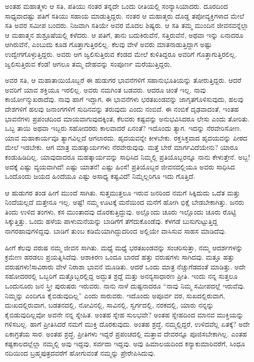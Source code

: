 ಅಂತಹ ಮಹಾತ್ಮಳು ಆ ಸತಿ, ಪತಿಯು ನಂತರ ತನ್ನದೇ ಒಂದು ರೀತಿಯಲ್ಲಿ ಸಂನ್ಯಾಸಿಯಾದರು. ದೂರದಿಂದ ಸಾಧ್ಯವಾದಷ್ಟು ಪತಿಗೆ ಸತಿಯು ಸಹಾಯ ಮಾಡುತ್ತಿದ್ದರು. ನಂತರ ಆ ಮಹಾತ್ಮರು ದೊಡ್ಡ ತಪೋವ್ಯಕ್ತಿಗಳಾದ ಮೇಲೆ ಸತಿ ಅವರ ಸಮೀಪ ಬಂದರು. ನಿಜವಾಗಿ ಸತಿಯೇ ಅವರ ಮೊದಲ ಶಿಷ್ಯರು. ಆ ಸತಿ ತಮ್ಮ ಮುಂದಿನ ಜೀವನವನ್ನೆಲ್ಲಾ ಆ ಮಹಾತ್ಮನ ಶುಶ್ರೂಷೆಯಲ್ಲಿ ಕಳೆದರು. ಆ ಪತಿಗೆ, ತಾನು ಬದುಕಿರುವೆನೆ, ಸತ್ತಿರುವೆನೆ, ಅಥವಾ ಇನ್ನು ಏನಾದರೂ ಆಗಿರುವೆನೆ, ಎಂಬುದು ಕೂಡ ಗೊತ್ತಾಗುತ್ತಿರಲಿಲ್ಲ. ಕೆಲವು ವೇಳೆ ಅವರು ಮಾತನಾಡುತ್ತಿದ್ದಾಗ ಅಷ್ಟು ಉದ್ವೇಗಗೊಳ್ಳುತ್ತಿದ್ದರು. ಅವರು ಆಗ ಜ್ವಲಿಸುತ್ತಿರುವ ಕೆಂಡದ ಮೇಲೆ ಕುಳಿತಿದ್ದರೂ ಅವರಿಗೆ ಗೊತ್ತಾಗುತ್ತಿರಲಿಲ್ಲ. ಜ್ವಲಿಸುತ್ತಿರುವ ಕೆಂಡ! ಆಗಲೂ ತಮ್ಮ ದೇಹವನ್ನು ಸಂಪೂರ್ಣ ಮರೆಯುತ್ತಿದ್ದರು.

ಅವರ ಸತಿ, ಆ ಮಹಾತಾಯಿಯೊಬ್ಬರೆ ಈ ಹುಡುಗರ ಭಾವನೆಗಳಿಗೆ ಸಹಾನುಭೂತಿಯನ್ನು ತೋರುತ್ತಿದ್ದರು. ಆದರೆ ಅವರಿಗೆ ಯಾವ ಶಕ್ತಿಯೂ ಇರಲಿಲ್ಲ. ಅವರು ನಮಗಿಂತ ಬಡವರು. ಆದರೂ ಚಿಂತೆ ಇಲ್ಲ. ನಾವು ಕಾರ್ಯೋನ್ಮುಖರಾದೆವು. ನಾವು ಹಾಗೆ ಇದ್ದಾಗ, ಈ ಭಾವನೆಗಳು ಭರತಖಂಡವನ್ನು ಜಾಗೃತಗೊಳಿಸುವುದು, ಹಲವು ದೇಶಗಳಿಗೆ ಹಲವು ಜನಾಂಗಗಳಿಗೆ ಸುದಿನವನ್ನು ತರುವುದು ಎಂದು ನಂಬಿದೆ. ಈ ನಂಬಿಕೆ ದೃಢವಾದಂತೆ, ಇಂತಹ ಭಾವನೆಗಳು ಪ್ರಪಂಚದಿಂದ ಮಾಯವಾಗುವುದಕ್ಕಿಂತ, ಕೆಲವರು ಕಷ್ಟವನ್ನು ಅನುಭವಿಸಿದರೂ ಲೇಸು ಎಂದು ತೋರಿತು. ಒಬ್ಬ ತಾಯಿ ಅಥವಾ ಇಬ್ಬರು ಸಹೋದರರು ಕಾಲವಾದರೆ ಏನಂತೆ? ಇದೊಂದು ತ್ಯಾಗ. ಇದನ್ನು ನೆರವೇರಿಸೋಣ. ಯಾವ ಮಹಾಕಾರ್ಯವೂ ತ್ಯಾಗವಿಲ್ಲದೆ ಆಗಲಾರದು. ಹೃದಯವನ್ನೇ ಕೀಳಬೇಕು. ರಕ್ತಸಿಕ್ತವಾದ ಹೃದಯವನ್ನು ಪೀಠದ ಮೇಲೆ ಇಡಬೇಕು. ಆಗ ಮಾತ್ರ ಮಹತ್ಕಾರ್ಯಗಳು ನೆರವೇರುವುವು. ಮತ್ತೆ ಬೇರೆ ಮಾರ್ಗವಿದೆಯೇನು? ಯಾರೂ ಕಂಡುಹಿಡಿದಿಲ್ಲ. ಯಾವುದಾದರೂ ಮಹತ್ಕಾರ್ಯವನ್ನು ಸಾಧಿಸಿದ ನಿಮ್ಮಲ್ಲಿ ಪ್ರತಿಯೊಬ್ಬರನ್ನೂ ನಾನು ಕೇಳುತ್ತೇನೆ. ಅಬ್ಬ! ಅದಕ್ಕೆ ಎಷ್ಟು ವ್ಯಯವಾಗಿದೆ! ಎಷ್ಟು ಯಾತನೆ! ಎಷ್ಟು ಹಿಂಸೆ! ಪ್ರತಿಯೊಬ್ಬರ ಜೀವನದಲ್ಲಿಯೂ ಅವರು ಸಾಧಿಸಿದ ಒಂದೊಂದು ಜಯದ ಹಿಂದೆಯೂ ಎಷ್ಟು ಅಸಾಧ್ಯ ಕಷ್ಟವಿದೆ! ನಿಮ್ಮೆಲ್ಲರಿಗೂ ಇದು ಗೊತ್ತಿದೆ.

ಆ ಹುಡುಗರ ತಂಡ ಹೀಗೆ ಮುಂದೆ ಸಾಗಿತು. ಸುತ್ತಮುತ್ತಲೂ ಇರುವ ಜನರಿಂದ ನಮಗೆ ಸಿಕ್ಕಿದುದು ಒದೆತ ಮತ್ತು ನಿಂದೆಯಲ್ಲದೆ ಮತ್ತೇನೂ ಇಲ್ಲ. ಅಷ್ಟೆ! ನಮ್ಮ ಊಟಕ್ಕೆ ಮನೆಯಿಂದ ಮನೆಗೆ ಹೋಗಿ ಭಿಕ್ಷೆ ಬೇಡಬೇಕಾಗಿತ್ತು. ಜನರು ತಿಂದು ಉಳಿದ ತಂಗಳು, ಕಸ ಮುಂತಾದವು ದೊರಕುತ್ತಿದ್ದುವು. ಅಲ್ಲೊಂದು ಚೂರು ಇಲ್ಲೊಂದು ಚೂರು ರೊಟ್ಟಿ ಸಿಕ್ಕುತ್ತಿತ್ತು. ಒಂದು ಹಳೆಯ ಪಾಳುಮನೆಯನ್ನು ಬಾಡಿಗೆಗೆ ತೆಗೆದುಕೊಂಡೆವು. ಕೆಳಗಡೆ ಬುಸುಗುಟ್ಟುತ್ತಿದ್ದ ನಾಗರಹಾವುಗಳಿದ್ದವು. ಬಾಡಿಗೆ ತುಂಬ ಕಡಿಮೆಯಾಗಿದ್ದುದರಿಂದ ಅಲ್ಲಿಯೇ ವಾಸಿಸುವ ಸಾಹಸ ಮಾಡಿದೆವು.

ಹೀಗೆ ಕೆಲವು ವರುಷ ನಮ್ಮ ಜೀವನ ಸಾಗಿತು. ಮಧ್ಯೆ ಮಧ್ಯೆ ಭರತಖಂಡವನ್ನು ಸಂಚರಿಸುತ್ತಾ, ನಮ್ಮ ಆದರ್ಶಗಳನ್ನು ಕ್ರಮೇಣ ಹರಡಲು ಪ್ರಯತ್ನಿಸಿದೆವು. ಆಶಾಕಿರಣ ಒಂದೂ ಬಾರದೆ ಹತ್ತು ವರುಷಗಳು ಸಾಗಿದವು. ಮತ್ತೂ ಹತ್ತು ವರುಷಗಳು!ಸಾವಿರಾರು ವೇಳೆ ನಿರಾಶಾ ಭಾವನೆ ಮೂಡಿತು. ಆದರೆ ಒಂದು ಮಾತ್ರ ನೆಚ್ಚುಗೆಡದಂತೆ ಮಾಡಿತ್ತು. ಅದೇ ಸಹೋದರರಲ್ಲಿ ಒಬ್ಬರಿಗೆ ಮತ್ತೊಬ್ಬರಲ್ಲಿದ್ದ ಅದ್ಭುತ ಶ್ರದ್ದೆ ಮತ್ತು ಅನನ್ಯಸಾಧಾರಣ ಪ್ರೀತಿ. ಇಂದು ನನ್ನ ಸುತ್ತಲೂ ಒಂದುನೂರು ಜನ ಸ್ತ್ರೀ ಪುರುಷರು ಇರುವರು. ನಾನು ನಾಳೆ ದುಷ್ಟನಾದರೂ “ನಾವು ನಿಮ್ಮ ಸಮೀಪದಲ್ಲೆ ಇರುವೆವು. ನಿಮ್ಮನ್ನು ಎಂದಿಗೂ ಕೈಬಿಡುವುದಿಲ್ಲ” ಎಂದು ಸಾರುವರು. ಇದೊಂದು ಅಪೂರ್ವ ವರ, ಸುಖದಲ್ಲಿರುವಾಗ, ದುಃಖದಲ್ಲಿರುವಾಗ, ಬಡತನದಲ್ಲಿ, ನೋವಿನಲ್ಲಿ, ಸಾವಿನಲ್ಲಿ, ಸ್ವರ್ಗದಲ್ಲಿ, ನರಕದಲ್ಲಿ, ಯಾರು ನನ್ನನ್ನು ಕೈಬಿಡುವುದಿಲ್ಲವೋ ಅವನೇ ನನ್ನ ಸ್ನೇಹಿತ. ಅಂತಹ ಸ್ನೇಹ ಸುಲಭವೇ? ಅಂತಹ ಸ್ನೇಹದಿಂದ ಮಾನವ ಮುಕ್ತಿಯನ್ನು ಗಳಿಸಬಲ್ಲ. ಹಾಗೆ ಪ್ರೀತಿಸಿದರೆ ನಮಗೆ ಮುಕ್ತಿ ದೊರಕುವುದು. ಅಂತಹ ಶ್ರದ್ಧೆ, ನಮ್ಮಲ್ಲಿದ್ದರೆ, ಉಳಿದವೆಲ್ಲ ಏತಕ್ಕೆ? ಅದೇ ಏಕಾಗ್ರತೆಯ ಸಾರ. ಅಂತಹ ಶ್ರದ್ಧೆ, ಪ್ರೀತಿಗಳು ಇದ್ದರೆ ಪ್ರಪಂಚದಲ್ಲಿ ಮತ್ತಾವ ದೇವರನ್ನೂ ಪೂಜಿಸಬೇಕಾಗಿಲ್ಲ. ಎಂತಹ ಕಷ್ಟಕಾಲದಲ್ಲೆಲ್ಲಾ ನಮ್ಮಲ್ಲಿ ಅವು ಇದ್ದವು, ಸರ್ವದಾ ಇದ್ದವು. ಅವು ಹಿಮಾಲಯದಿಂದ ಕನ್ಯಾಕುಮಾರಿವರೆಗೆ, ಸಿಂಧೂ ನದಿಯಿಂದ ಬ್ರಹ್ಮಪುತ್ರದವರೆಗೆ ಹೋಗುವಂತೆ ನಮ್ಮನ್ನು ಪ್ರೇರೇಪಿಸಿದುವು.

